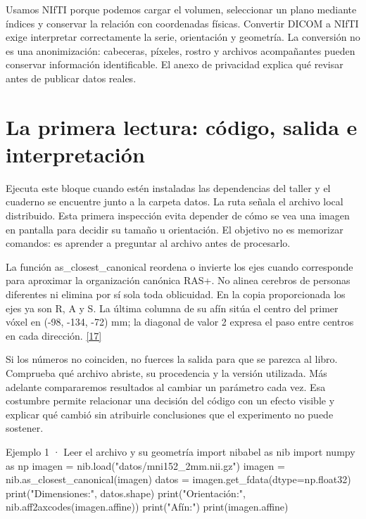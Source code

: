 Usamos NIfTI porque podemos cargar el volumen, seleccionar un plano mediante índices y conservar la relación con coordenadas físicas. Convertir DICOM a NIfTI exige interpretar correctamente la serie, orientación y geometría. La conversión no es una anonimización: cabeceras, píxeles, rostro y archivos acompañantes pueden conservar información identificable. El anexo de privacidad explica qué revisar antes de publicar datos reales.


\section{La primera lectura: código, salida e interpretación}

Ejecuta este bloque cuando estén instaladas las dependencias del taller y el cuaderno se encuentre junto a la carpeta datos. La ruta señala el archivo local distribuido. Esta primera inspección evita depender de cómo se vea una imagen en pantalla para decidir su tamaño u orientación. El objetivo no es memorizar comandos: es aprender a preguntar al archivo antes de procesarlo.


La función as\_closest\_canonical reordena o invierte los ejes cuando corresponde para aproximar la organización canónica RAS+. No alinea cerebros de personas diferentes ni elimina por sí sola toda oblicuidad. En la copia proporcionada los ejes ya son R, A y S. La última columna de su afín sitúa el centro del primer vóxel en (-98, -134, -72) mm; la diagonal de valor 2 expresa el paso entre centros en cada dirección. \hyperlink{refR17}{[17]}


Si los números no coinciden, no fuerces la salida para que se parezca al libro. Comprueba qué archivo abriste, su procedencia y la versión utilizada. Más adelante compararemos resultados al cambiar un parámetro cada vez. Esa costumbre permite relacionar una decisión del código con un efecto visible y explicar qué cambió sin atribuirle conclusiones que el experimento no puede sostener.



\begin{Codigo}{Ejemplo 1 · Leer el archivo y su geometría}
import nibabel as nib
import numpy as np
imagen = nib.load("datos/mni152_2mm.nii.gz")
imagen = nib.as_closest_canonical(imagen)
datos = imagen.get_fdata(dtype=np.float32)
print("Dimensiones:", datos.shape)
print("Orientación:", nib.aff2axcodes(imagen.affine))
print("Afín:")
print(imagen.affine)
\end{Codigo}

